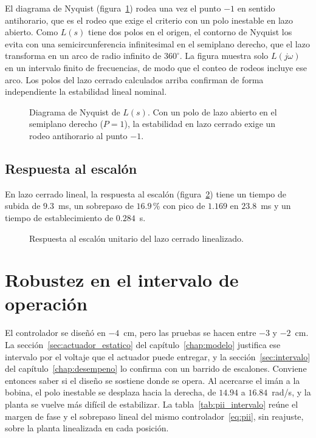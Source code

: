 El diagrama de Nyquist (figura~\ref{nyquist}) rodea una vez el punto $-1$ en sentido antihorario, que es el rodeo que exige el criterio con un polo inestable en lazo abierto. Como $L(s)$ tiene dos polos en el origen, el contorno de Nyquist los evita con una semicircunferencia infinitesimal en el semiplano derecho, que el lazo transforma en un arco de radio infinito de $360^\circ$. La figura muestra solo $L(j\omega)$ en un intervalo finito de frecuencias, de modo que el conteo de rodeos incluye ese arco. Los polos del lazo cerrado calculados arriba confirman de forma independiente la estabilidad lineal nominal.

\begin{figure}[ht]
    \centering
    
    \caption[Diagrama de Nyquist]{Diagrama de Nyquist de $L(s)$. Con un polo de lazo abierto en el semiplano derecho ($P=1$), la estabilidad en lazo cerrado exige un rodeo antihorario al punto $-1$.}
    \label{nyquist}
\end{figure}

\subsection{Respuesta al escalón}

En lazo cerrado lineal, la respuesta al escalón (figura~\ref{step_response}) tiene un tiempo de subida de $9.3$~ms, un sobrepaso de $16.9$\,\% con pico de $1.169$ en $23.8$~ms y un tiempo de establecimiento de $0.284$~s.

\begin{figure}[ht]
    \centering
    
    \caption[Respuesta al escalón]{Respuesta al escalón unitario del lazo cerrado linealizado.}
    \label{step_response}
\end{figure}

\section{Robustez en el intervalo de operación}\label{sec:robustez_pii}

El controlador se diseñó en $-4$~cm, pero las pruebas se hacen entre $-3$ y $-2$~cm. La sección~\ref{sec:actuador_estatico} del capítulo~\ref{chap:modelo} justifica ese intervalo por el voltaje que el actuador puede entregar, y la sección~\ref{sec:intervalo} del capítulo~\ref{chap:desempeno} lo confirma con un barrido de escalones. Conviene entonces saber si el diseño se sostiene donde se opera. Al acercarse el imán a la bobina, el polo inestable se desplaza hacia la derecha, de $14.94$ a $16.84$~rad/s, y la planta se vuelve más difícil de estabilizar. La tabla~\ref{tab:pii_intervalo} reúne el margen de fase y el sobrepaso lineal del mismo controlador~\eqref{eq:pii}, sin reajuste, sobre la planta linealizada en cada posición.

